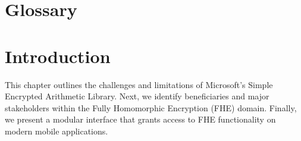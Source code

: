\documentclass [11pt, proquest] {uwthesis}[2020/02/24]
\begin{document}
 
%
%

\prelimpages
 
%
%


\copyrightpage

\titlepage  

 
%
%

%
%


\setcounter{page}{-1}

 
%
%
\tableofcontents
\listoffigures
\listoftables
 
%
%
\chapter*{Glossary}      %
\thispagestyle{plain}
%

 
%
%

%

%
%

\textpages
 
 
\chapter {Introduction}

This chapter outlines the challenges and limitations of Microsoft's Simple Encrypted Arithmetic Library. Next, we identify beneficiaries and major stakeholders within the Fully Homomorphic Encryption (FHE) domain. Finally, we present a modular interface that grants access to FHE functionality on modern mobile applications.
\end{document}
